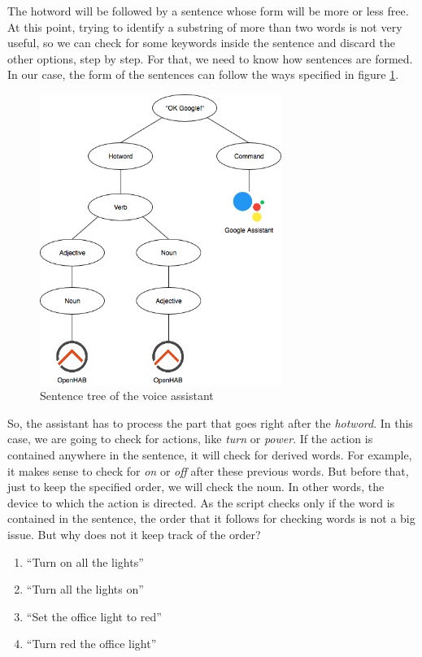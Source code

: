 The hotword will be followed by a sentence whose form will be more or less free. At this point, trying to identify a substring of
more than two words is not very useful, so we can check for some keywords inside the sentence and discard the other options, step
by step. For that, we need to know how sentences are formed. In our case, the form of the sentences can follow the ways specified
in figure \ref{fig:sentence-tree}.

\begin{figure}
	\centering
	\includegraphics[width=0.7\textwidth]{images/Chapter_07/sentence-tree.png}
	\caption{Sentence tree of the voice assistant}
	\label{fig:sentence-tree}
\end{figure}

So, the assistant has to process the part that goes right after the \textit{hotword}. In this case, we are going to check for actions,
like \textit{turn} or \textit{power}. If the action is contained anywhere in the sentence, it will check for derived words. For
example, it makes sense to check for \textit{on} or \textit{off} after these previous words. But before that, just to keep the
specified order, we will check the noun. In other words, the device to which the action is directed. As the script checks only if
the word is contained in the sentence, the order that it follows for checking words is not a big issue. But why does not it keep
track of the order?

\begin{enumerate}
	\item “Turn on all the lights”
	\item “Turn all the lights on”\\

	\item “Set the office light to red”
	\item “Turn red the office light”
\end{enumerate}

